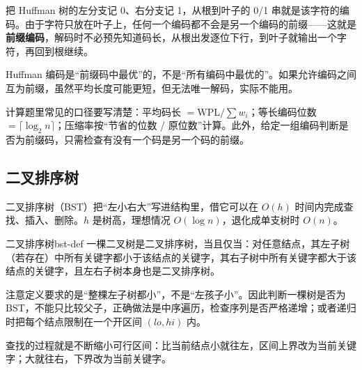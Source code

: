 把 Huffman 树的左分支记 0、右分支记 1，从根到叶子的 0/1 串就是该字符的编码。由于字符只放在叶子上，任何一个编码都不会是另一个编码的前缀——这就是\textbf{前缀编码}，解码时不必预先知道码长，从根出发逐位下行，到叶子就输出一个字符，再回到根继续。

\begin{attention}
Huffman 编码是“前缀码中最优”的，不是“所有编码中最优的”。如果允许编码之间互为前缀，虽然平均长度可能更短，但无法唯一解码，实际不能用。

计算题里常见的口径要写清楚：平均码长 $=\mathrm{WPL}/\sum w_i$；等长编码位数 $=\lceil\log_2 n\rceil$；压缩率按“节省的位数 / 原位数”计算。此外，给定一组编码判断是否为前缀码，只需检查有没有一个码是另一个码的前缀。
\end{attention}

\subsection{二叉排序树}

二叉排序树（BST）把“左小右大”写进结构里，借它可以在 $O(h)$ 时间内完成查找、插入、删除。$h$ 是树高，理想情况 $O(\log n)$，退化成单支树时 $O(n)$。

\begin{mydef}{二叉排序树}{bst-def}
一棵二叉树是二叉排序树，当且仅当：对任意结点，其左子树（若存在）中所有关键字都小于该结点的关键字，其右子树中所有关键字都大于该结点的关键字，且左右子树本身也是二叉排序树。
\end{mydef}

注意定义要求的是“整棵左子树都小”，不是“左孩子小”。因此判断一棵树是否为 BST，不能只比较父子，正确做法是中序遍历，检查序列是否严格递增；或者递归时把每个结点限制在一个开区间 $(lo,hi)$ 内。

查找的过程就是不断缩小可行区间：比当前结点小就往左，区间上界改为当前关键字；大就往右，下界改为当前关键字。


